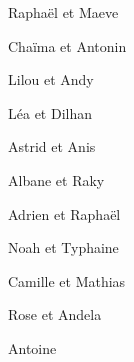 \item Raphaël et Maeve
\item Chaïma et Antonin
\item Lilou et Andy
\item Léa et Dilhan
\item Astrid et Anis
\item Albane et Raky
\item Adrien et Raphaël
\item Noah et Typhaine
\item Camille et Mathias
\item Rose et Andela
\item Antoine
